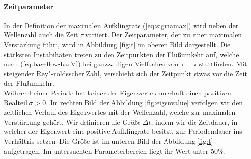 \documentclass[10pt,a5paper,oneside,draft]{book}
\numberwithin{equation}{chapter}
\begin{document}
\paragraph{Zeitparameter}
In der Definition der maximalen Aufklingrate (\mbox{\ref{eq:sigmamax}}) wird neben der Wellenzahl auch die Zeit $\tau$ variiert.
Der Zeitparameter, der zu einer maximalen Verst\"arkung f\"uhrt, wird in Abbildung \ref{fig:t} im oberen Bild dargestellt.
Die st\"arksten Instabilt\"aten treten zu den Zeitpunkten der Flu\ss umkehr auf, welche nach (\mbox{\ref{eq:baseflow-barV}}) bei ganzzahligen Vielfachen von $\tau=\pi$ stattfinden.
Mit steigender Rey"-noldsscher Zahl, verschiebt sich der Zeitpunkt etwas vor die Zeit der Flu\ss umkehr.\\

W\"ahrend einer Periode hat keiner der Eigenwerte dauerhaft einen positiven Realteil $\sigma>0$.
Im rechten Bild der Abbildung \ref{fig:eigenvalue} verfolgen wir den zeitlichen Verlauf des Eigenwertes mit der Wellenzahl, welche zur maximalen Verst\"arkung geh\"ort.
Wir definieren die Gr\"o\ss e $\Delta t$, indem wir die Zeitdauer, in welcher der Eigenwert eine positive Aufklingrate besitzt, zur Periodendauer ins Verh\"altnis setzen.
Die Gr\"o\ss e ist im unteren Bild der Abbildung \ref{fig:t} aufgetragen.
Im untersuchten Parameterbereich liegt ihr Wert unter 50\%.\\
\end{document}
